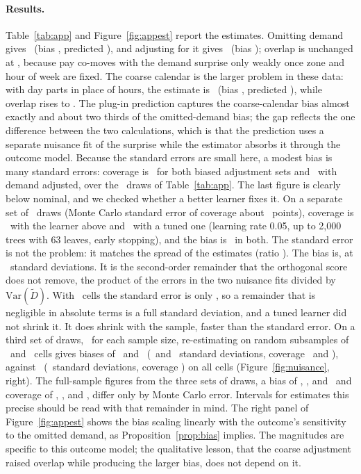 \documentclass[11pt]{article}
\theoremstyle{remark}
\newcommand{\Var}{\mathrm{Var}}
\begin{document}
\paragraph{Results.} Table~\ref{tab:app} and Figure~\ref{fig:appest} report the estimates. Omitting demand gives \AppATheta\ (bias \AppABias, predicted \AppAPred), and adjusting for it gives \AppBTheta\ (bias \AppBBias); overlap is unchanged at \AppBOv, because pay co-moves with the demand surprise only weakly once zone and hour of week are fixed. The coarse calendar is the larger problem in these data: with day parts in place of hours, the estimate is \AppCTheta\ (bias \AppCBias, predicted \AppCPred), while overlap rises to \AppCOv. The plug-in prediction captures the coarse-calendar bias almost exactly and about two thirds of the omitted-demand bias; the gap reflects the one difference between the two calculations, which is that the prediction uses a separate nuisance fit of the surprise while the estimator absorbs it through the outcome model. Because the standard errors are small here, a modest bias is many standard errors: coverage is \AppACov\ for both biased adjustment sets and \AppBCov\ with demand adjusted, over the \AppDraws\ draws of Table~\ref{tab:app}. The last figure is clearly below nominal, and we checked whether a better learner fixes it. On a separate set of \AppTuneDraws\ draws (Monte Carlo standard error of coverage about \AppTuneMCSE\ points), coverage is \AppTuneDefCov\ with the learner above and \AppTuneTunedCov\ with a tuned one (learning rate 0.05, up to 2{,}000 trees with 63 leaves, early stopping), and the bias is \AppTuneDefBias\ in both. The standard error is not the problem: it matches the spread of the estimates (ratio \AppTuneDefSESD). The bias is, at \AppTuneDefBiasSD\ standard deviations. It is the second-order remainder that the orthogonal score does not remove, the product of the errors in the two nuisance fits divided by $\Var(\tilde D)$. With \AppN\ cells the standard error is only \AppTuneDefSE, so a remainder that is negligible in absolute terms is a full standard deviation, and a tuned learner did not shrink it. It does shrink with the sample, faster than the standard error. On a third set of draws, \AppSubDraws\ for each sample size, re-estimating on random subsamples of \AppSubQuarterN\ and \AppSubHalfN\ cells gives biases of \AppSubQuarterBias\ and \AppSubHalfBias\ (\AppSubQuarterBiasSD\ and \AppSubHalfBiasSD\ standard deviations, coverage \AppSubQuarterCov\ and \AppSubHalfCov), against \AppSubFullBias\ (\AppSubFullBiasSD\ standard deviations, coverage \AppSubFullCov) on all cells (Figure~\ref{fig:nuisance}, right). The full-sample figures from the three sets of draws, a bias of \AppBBias, \AppTuneDefBias, and \AppSubFullBias\ and coverage of \AppBCov, \AppTuneDefCov, and \AppSubFullCov, differ only by Monte Carlo error. Intervals for estimates this precise should be read with that remainder in mind. The right panel of Figure~\ref{fig:appest} shows the bias scaling linearly with the outcome's sensitivity to the omitted demand, as Proposition~\ref{prop:bias} implies. The magnitudes are specific to this outcome model; the qualitative lesson, that the coarse adjustment raised overlap while producing the larger bias, does not depend on it.
\end{document}
